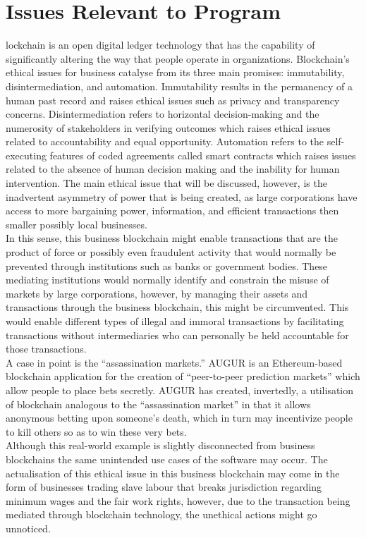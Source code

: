 
\let\textcircled=\pgftextcircled
\chapter{Issues Relevant to Program}

lockchain is an open digital ledger technology that has the capability of significantly altering the way that people operate in organizations. Blockchain’s ethical issues for business catalyse from its three main promises: immutability, disintermediation, and automation. Immutability results in the permanency of a human past record and raises ethical issues such as privacy and transparency concerns. Disintermediation refers to horizontal decision-making and the numerosity of stakeholders in verifying outcomes which raises ethical issues related to accountability and equal opportunity. Automation refers to the self-executing features of coded agreements called smart contracts which raises issues related to the absence of human decision making and the inability for human intervention. The main ethical issue that will be discussed, however, is the inadvertent asymmetry of power that is being created, as large corporations have access to more bargaining power, information, and efficient transactions then smaller possibly local businesses. \\

In this sense, this business blockchain might enable transactions that are the product of force or possibly even fraudulent activity that would normally be prevented through institutions such as banks or government bodies. These mediating institutions would normally identify and constrain the misuse of markets by large corporations, however, by managing their assets and transactions through the business blockchain, this might be circumvented. This would enable different types of illegal and immoral transactions by facilitating transactions without intermediaries who can personally be held accountable for those transactions. \\

A case in point is the “assassination markets.” AUGUR is an Ethereum-based blockchain application for the creation of “peer-to-peer prediction markets” which allow people to place bets secretly. AUGUR has created, invertedly, a utilisation of blockchain analogous to the “assassination market” in that it allows anonymous betting upon someone's death, which in turn may incentivize people to kill others so as to win these very bets. \\

Although this real-world example is slightly disconnected from business blockchains the same unintended use cases of the software may occur. The actualisation of this ethical issue in this business blockchain may come in the form of businesses trading slave labour that breaks jurisdiction regarding minimum wages and the fair work rights, however, due to the transaction being mediated through blockchain technology, the unethical actions might go unnoticed.
